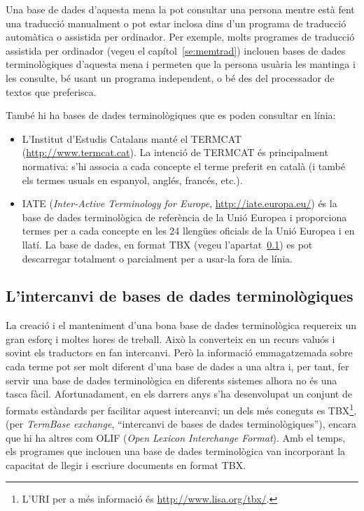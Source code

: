 Una base de dades d'aquesta mena la pot consultar una persona mentre
està fent una traducció manualment o pot estar inclosa dins d'un
programa de traducció automàtica o assistida per ordinador. Per
exemple, molts programes de traducció assistida per ordinador (vegeu
el capítol~\ref{se:memtrad}) inclouen bases de dades terminològiques
d'aquesta mena i permeten que la persona usuària les mantinga i les
consulte, bé usant un programa independent, o bé des del processador
de textos que preferisca.

També hi ha bases de dades terminològiques que es poden consultar en
línia: 
\begin{itemize}
\item L'Institut d'Estudis Catalans manté el TERMCAT
  (\url{http://www.termcat.cat}). La intenció de TERMCAT és
  principalment normativa: s'hi associa a cada concepte el terme
  preferit en català (i també els termes usuals en espanyol, anglés,
  francés, etc.).
\item IATE (\emph{Inter-Active Terminology for Europe},
  \url{http://iate.europa.eu/}) és la base de dades terminològica de
  referència de la Unió Europea i proporciona termes per a cada
  concepte en les 24 llengües oficials de la Unió Europea i en
  llatí. La base de dades, en format TBX (vegeu
  l'apartat~\ref{s3:tbx}) es pot descarregar totalment o parcialment per a
  usar-la fora de línia.
\end{itemize}

\subsection{L'intercanvi de bases de dades terminològiques}
\label{s3:tbx}

La creació i el manteniment d'una bona base de dades terminològica
requereix un gran esforç i moltes hores de treball. Això la converteix
en un recurs valuós i sovint els traductors en fan intercanvi. Però la
informació emmagatzemada sobre cada terme pot ser molt diferent d'una
base de dades a una altra i, per tant, fer servir una base de dades
terminològica en diferents sistemes alhora no és una tasca
fàcil. Afortunadament, en els darrers anys s'ha desenvolupat un
conjunt de formats estàndards per facilitar aquest intercanvi; un dels
més coneguts es TBX\footnote{L'URI per a més informació és
  \url{http://www.lisa.org/tbx/}.}, (per \emph{TermBase exchange},
``intercanvi de bases de dades terminològiques''), encara que hi ha
altres com OLIF (\emph{Open Lexicon Interchange Format}). Amb el
temps, els programes que inclouen una base de dades terminològica van
incorporant la capacitat de llegir i escriure documents en format TBX.

